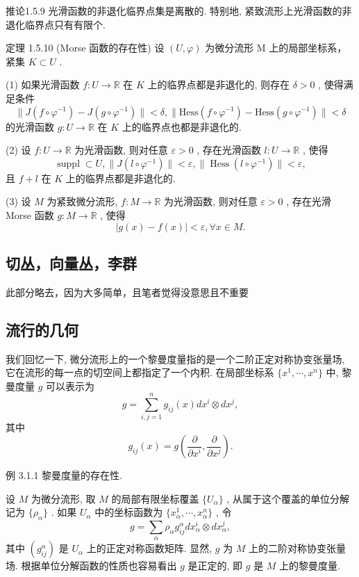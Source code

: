 \documentclass[]{article}
\begin{document}
推论1.5.9 光滑函数的非退化临界点集是离散的. 特别地, 紧致流形上光滑函数的非退化临界点只有有限个. 

定理 1.5.10 (Morse 函数的存在性) 设 $(U,\varphi)$ 为微分流形 M 上的局部坐标系，紧集 $K\subset U$ . 

(1) 如果光滑函数 $f: U \to \mathbb{R}$ 在 $K$ 上的临界点都是非退化的, 则存在 $\delta > 0$ , 使得满足条件 $$
\| J (f \circ \varphi^ {- 1}) - J (g \circ \varphi^ {- 1}) \| <   \delta , \| \mathrm{Hess} (f \circ \varphi^ {- 1}) - \mathrm{Hess} (g \circ \varphi^ {- 1}) \| <   \delta
$$的光滑函数 $g: U \to \mathbb{R}$ 在 $K$ 上的临界点也都是非退化的. 

(2) 设 $f: U \to \mathbb{R}$ 为光滑函数, 则对任意 $\varepsilon > 0$ , 存在光滑函数 $l: U \to \mathbb{R}$ , 使得 $$
\operatorname{suppl} \subset U, \| J (l \circ \varphi^ {- 1}) \| <   \varepsilon , \| \operatorname{Hess} (l \circ \varphi^ {- 1}) \| <   \varepsilon ,
$$且 $f + l$ 在 $K$ 上的临界点都是非退化的. 

(3) 设 $M$ 为紧致微分流形, $f: M \to \mathbb{R}$ 为光滑函数, 则对任意 $\varepsilon > 0$ , 存在光滑 Morse 函数 $g: M \to \mathbb{R}$ , 使得 $$
| g (x) - f (x) | <   \varepsilon , \forall x \in M.
$$

\subsection{切丛，向量丛，李群}

此部分略去，因为大多简单，且笔者觉得没意思且不重要

\subsection{流行的几何}

我们回忆一下, 微分流形上的一个黎曼度量指的是一个二阶正定对称协变张量场, 它在流形的每一点的切空间上都指定了一个内积. 在局部坐标系 $\{x^{1}, \cdots, x^{n}\}$ 中, 黎曼度量 $g$ 可以表示为 $$
g = \sum_ {i, j = 1} ^ {n} g _ {i j} (x) d x ^ {i} \otimes d x ^ {j},
$$其中$$
g _ {i j} (x) = g \left(\frac {\partial}{\partial x ^ {i}}, \frac {\partial}{\partial x ^ {j}}\right).
$$

例 3.1.1 黎曼度量的存在性. 

设 $M$ 为微分流形, 取 $M$ 的局部有限坐标覆盖 $\{U_{\alpha}\}$ , 从属于这个覆盖的单位分解记为 $\{\rho_{\alpha}\}$ . 如果 $U_{\alpha}$ 中的坐标函数为 $\{x_{\alpha}^{1}, \cdots, x_{\alpha}^{n}\}$ , 令 $$
g = \sum_ {\alpha} \rho_ {\alpha} g _ {i j} ^ {\alpha} d x _ {\alpha} ^ {i} \otimes d x _ {\alpha} ^ {j},
$$其中 $(g_{ij}^{\alpha})$ 是 $U_{\alpha}$ 上的正定对称函数矩阵. 显然, $g$ 为 $M$ 上的二阶对称协变张量场. 根据单位分解函数的性质也容易看出 $g$ 是正定的, 即 $g$ 是 $M$ 上的黎曼度量. 
\end{document}
